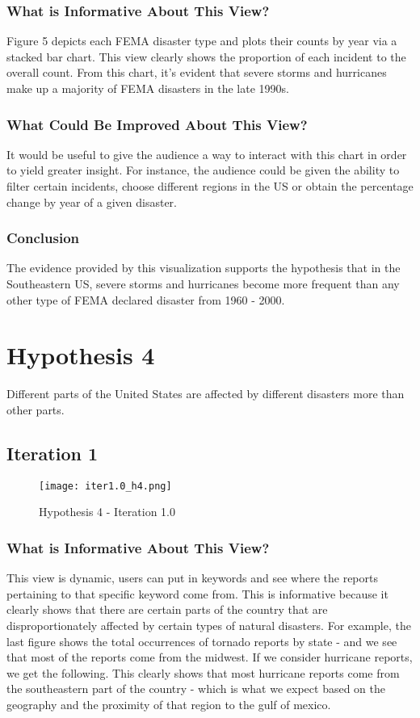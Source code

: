 \documentclass[11pt, letter]{article}
\begin{document}
\subsubsection*{What is Informative About This View?}
Figure 5 depicts each FEMA disaster type and plots their counts by year via a stacked bar chart. This view clearly shows the proportion of each incident to the overall count. From this chart, it’s evident that severe storms and hurricanes make up a majority of FEMA disasters in the late 1990s. 
\subsubsection*{What Could Be Improved About This View?}
 It would be useful to give the audience a way to interact with this chart in order to yield greater insight. For instance, the audience could be given the ability to filter certain incidents, choose different regions in the US or obtain the percentage change by year of a given disaster. 
\subsubsection*{Conclusion}
The evidence provided by this visualization supports the hypothesis that in the Southeastern US, severe storms and hurricanes become more frequent than any other type of FEMA declared disaster from 1960 - 2000.
  
\section*{Hypothesis 4}
Different parts of the United States are affected by different disasters more than other parts.

 \subsection*{Iteration 1}
 \begin{figure}[h]
    \centering
    \texttt{[image: iter1.0\_h4.png]}
    \caption{Hypothesis 4 - Iteration 1.0}
    \label{fig:my_label}
\end{figure}

\subsubsection*{What is Informative About This View?}
This view is dynamic, users can put in keywords and see where the reports pertaining to that specific keyword come from. This is informative because it clearly shows that there are certain parts of the country that are disproportionately affected by certain types of natural disasters. For example, the last figure shows the total occurrences of tornado reports by state - and we see that most of the reports come from the midwest. If we consider hurricane reports, we get the following. This clearly shows that most hurricane reports come from the southeastern part of the country - which is what we expect based on the geography and the proximity of that region to the gulf of mexico.
\end{document}
